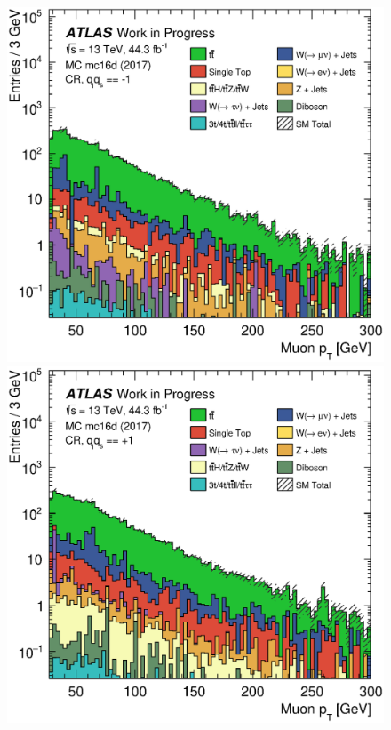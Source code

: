 \begin{figure}[th!]
    \vspace{-1.8em}
    \includegraphics[width=\individualPlotWidth]{Assets/Plots/qq-sign/qq==-1/h_stack_mc16d_mu_pt.eps}
    \hspace{1em}
    \includegraphics[width=\individualPlotWidth]{Assets/Plots/qq-sign/qq==+1/h_stack_mc16d_mu_pt.eps}


\end{figure}
